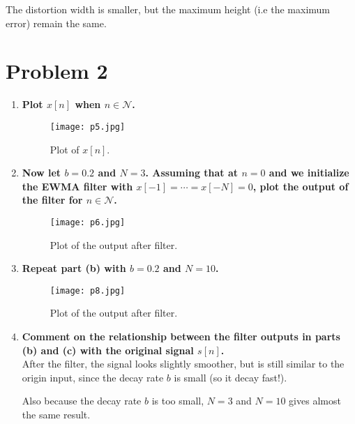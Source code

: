 \documentclass[12pt, a4paper]{article}
\begin{document}
\begin{enumerate}[label=(\alph*)]
    The distortion width is smaller, but the maximum height (i.e the maximum error) remain the same.

\section{Problem 2}
\begin{enumerate}[label=(\alph*)]
  \item {\bf Plot $x[n]$ when $ n \in \mathcal{N} $.}    \\[12pt]
    \begin{center}
    \begin{figure}[H]
      \centering
      \texttt{[image: p5.jpg]}
      \caption{Plot of $x[n]$.}
    \end{figure}
  \end{center}

\item {\bf Now let $b = 0.2$ and $N = 3$. Assuming that at $n = 0$ and we initialize the
  EWMA filter with $x[−1] = \cdots = x[−N] = 0$, plot the output of the filter for $n \in \mathcal{N}$.}
    \\[12pt]
    \begin{center}
    \begin{figure}[H]
      \centering
      \texttt{[image: p6.jpg]}
      \caption{Plot of the output after filter.}
    \end{figure}
  \end{center}

\item {\bf Repeat part (b) with $b = 0.2$ and $N = 10$.}    \\[12pt]
    \begin{center}
    \begin{figure}[H]
      \centering
      \texttt{[image: p8.jpg]}
      \caption{Plot of the output after filter.}
    \end{figure}
  \end{center}
  
\item {\bf Comment on the relationship between the filter outputs in parts (b) and (c)
  with the original signal $s[n]$.} \\[12pt]
  After the filter, the signal looks slightly smoother, but is still similar to the
  origin input, since the decay rate $b$ is small (so it decay fast!).

  Also because the decay rate $b$ is too small, $N = 3$ and $N = 10$ gives almost the
  same result.


\end{enumerate}
\end{enumerate}
\end{document}
